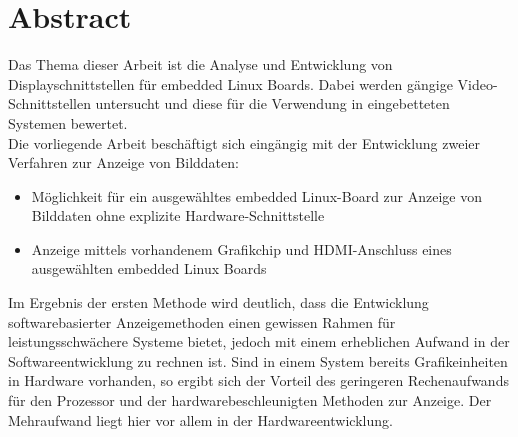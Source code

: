 \section*{Abstract}
\label{sec:Abstract}
Das Thema dieser Arbeit ist die Analyse und  Entwicklung von Displayschnittstellen für embedded Linux Boards. Dabei werden gängige Video-Schnittstellen untersucht und diese für die Verwendung in eingebetteten Systemen bewertet.\\
Die vorliegende Arbeit beschäftigt sich eingängig mit der Entwicklung zweier Verfahren zur Anzeige von Bilddaten:
\begin{itemize}
\item Möglichkeit für ein ausgewähltes embedded Linux-Board zur Anzeige von Bilddaten ohne explizite Hardware-Schnittstelle
\item Anzeige mittels vorhandenem Grafikchip und HDMI-Anschluss eines ausgewählten embedded Linux Boards
\end{itemize}
Im Ergebnis der ersten Methode wird deutlich, dass die Entwicklung softwarebasierter Anzeigemethoden einen gewissen Rahmen für leistungsschwächere Systeme bietet, jedoch mit einem erheblichen Aufwand in der Softwareentwicklung zu rechnen ist. Sind in einem System bereits Grafikeinheiten in Hardware vorhanden, so ergibt sich der Vorteil des geringeren Rechenaufwands für den Prozessor und der hardwarebeschleunigten Methoden zur Anzeige. Der Mehraufwand liegt hier vor allem in der Hardwareentwicklung.